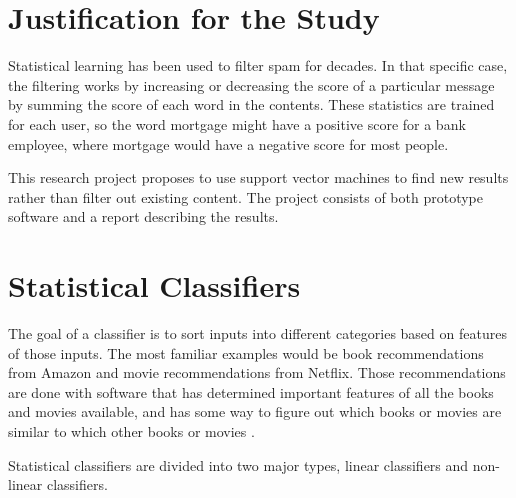 \documentclass[12pt]{article}
\begin{document}
\section{Justification for the Study}
Statistical learning has been used to filter spam for decades. In that specific case, the filtering works by
increasing or decreasing the score of a particular message by summing the score of each word in the contents.
These statistics are trained for each user, so the word mortgage might have a positive score for a bank
employee, where mortgage would have a negative score for most people.

This research project proposes to use support vector machines to find new results rather than filter out
existing content. The project consists of both prototype software and a report describing the results.

\section{Statistical Classifiers}

The goal of a classifier is to sort inputs into different categories based on features of those inputs. The
most familiar examples would be book recommendations from Amazon and movie recommendations from Netflix. Those
recommendations are done with software that has determined important features of all the books and movies
available, and has some way to figure out which books or movies are similar to which other books or
movies \citep{michie1994machine}.



Statistical classifiers are divided into two major types, linear classifiers and non-linear classifiers.
\end{document}

